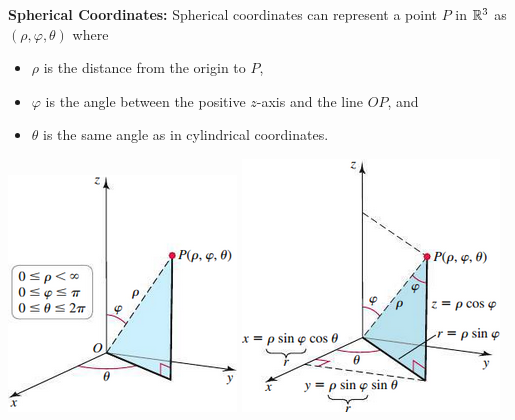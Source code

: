 \documentclass[mathNotesPreamble]{subfiles}
\begin{document}
  \textbf{Spherical Coordinates:}\newline
  Spherical coordinates can represent a point $P$ in $\mathbb{R}^3$ as $(\rho, \varphi, \theta)$ where
  \begin{itemize}
    \item $\rho$ is the distance from the origin to $P$,
    \item $\varphi$ is the angle between the positive $z$-axis and the line $OP$, and
    \item $\theta$ is the same angle as in cylindrical coordinates.
  \end{itemize}
  \begin{center}
    \includegraphics[width=0.4\linewidth]{images/briggs_16_05/fig16_55}
    \hspace*{25pt}
    \includegraphics[width=0.4\linewidth]{images/briggs_16_05/fig16_56}
  \end{center}
\end{document}

